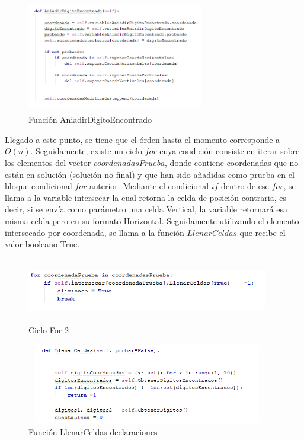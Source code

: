 \documentclass[journal]{IEEEtran}
\begin{document}
\begin{itemize}
		\begin{figure}[h]
			\centering
			\includegraphics[height= 140pt, width=220pt]{AnadirSolu.png}
			\caption{Función AniadirDigitoEncontrado}
		\end{figure}
	
		Llegado a este punto, se tiene que el órden hasta el momento corresponde a $O(n)$.
		Seguidamente, existe un ciclo $for$ cuya condición consiste en iterar sobre los elementos del vector $coordenadasPrueba$, donde contiene coordenadas que no están en solución (solución no final) y que han sido añadidas como prueba en el bloque condicional $for$ anterior. Mediante el condicional $if$ dentro de ese $for$, se llama a la variable intersecar la cual retorna la celda de posición contraria, es decir, si se envía como parámetro una celda Vertical, la variable retornará esa misma celda pero en su formato Horizontal. Seguidamente utilizando el elemento intersecado por coordenada, se llama a la función $LlenarCeldas$ que recibe el valor booleano True. 
		
		\begin{figure}[h]
			\centering
			\includegraphics[height= 80pt, width=300pt]{BTFor2.png}
			\caption{Ciclo For 2}
		\end{figure}
	
	
		\begin{figure}[h]
			\centering
			\includegraphics[height= 100pt, width=300pt]{LlenarCeldas1.png}
			\caption{Función LlenarCeldas declaraciones}
		\end{figure}
	

\end{itemize}
\end{document}
